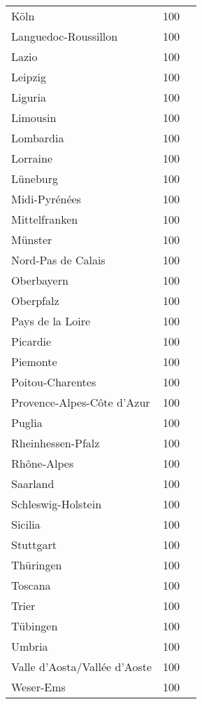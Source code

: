 \begin{table}[H]
\begin{tabularx}{\textwidth}{Xcc}
            Köln & 100 \\
            Languedoc-Roussillon & 100 \\
            Lazio & 100 \\
            Leipzig & 100 \\
            Liguria & 100 \\
            Limousin & 100 \\
            Lombardia & 100 \\
            Lorraine & 100 \\
            Lüneburg & 100 \\
            Midi-Pyrénées & 100 \\
            Mittelfranken & 100 \\
            Münster & 100 \\
            Nord-Pas de Calais & 100 \\
            Oberbayern & 100 \\
            Oberpfalz & 100 \\
            Pays de la Loire & 100 \\
            Picardie & 100 \\
            Piemonte & 100 \\
            Poitou-Charentes & 100 \\
            Provence-Alpes-Côte d’Azur & 100 \\
            Puglia & 100 \\
            Rheinhessen-Pfalz & 100 \\
            Rhône-Alpes & 100 \\
            Saarland & 100 \\
            Schleswig-Holstein & 100 \\
            Sicilia & 100 \\
            Stuttgart & 100 \\
            Thüringen & 100 \\
            Toscana & 100 \\
            Trier & 100 \\
            Tübingen & 100 \\
            Umbria & 100 \\
            Valle d’Aosta/Vallée d’Aoste & 100 \\
            Weser-Ems & 100 \\
        \bottomrule
    \end{tabularx}
\end{table}
        